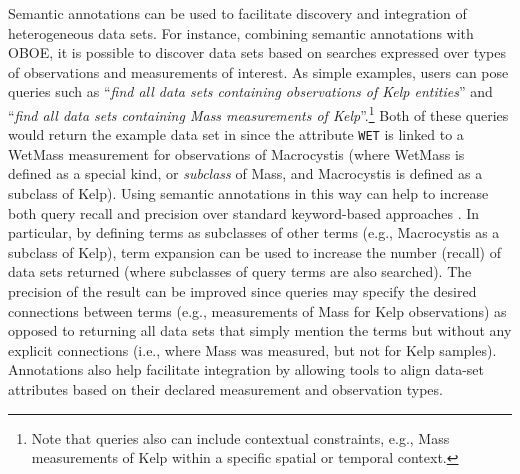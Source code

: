 Semantic annotations can be used to facilitate discovery and
integration of heterogeneous data sets. For instance, combining
semantic annotations with OBOE, it is possible to discover data sets
based on searches expressed over types of observations and
measurements of interest. As simple examples, users can pose queries
such as ``\emph{find all data sets containing observations of Kelp
  entities}'' and ``\emph{find all data sets containing Mass
  measurements of Kelp}''.\footnote{Note that queries also can include
  contextual constraints, e.g., Mass measurements of Kelp within a
  specific spatial or temporal context.} Both of these queries would
return the example data set in  since the
attribute {\tt WET} is linked to a WetMass measurement for observations
of Macrocystis (where WetMass is defined as a special kind, or
\emph{subclass} of Mass, and Macrocystis is defined as a subclass of
Kelp). Using semantic annotations in this way can help to increase
both query recall and precision over standard keyword-based approaches
\cite{berkley09:_improv_data_discov_for_metad}. In particular, by
defining terms as subclasses of other terms (e.g., Macrocystis as a
subclass of Kelp), term expansion can be used to increase the number
(recall) of data sets returned (where subclasses of query terms are
also searched). The precision of the result can be improved since
queries may specify the desired connections between terms (e.g.,
measurements of Mass for Kelp observations) as opposed to returning
all data sets that simply mention the terms but without any explicit
connections (i.e., where Mass was measured, but not for Kelp samples).
Annotations also help facilitate integration by allowing tools to
align data-set attributes based on their declared measurement and
observation types.


